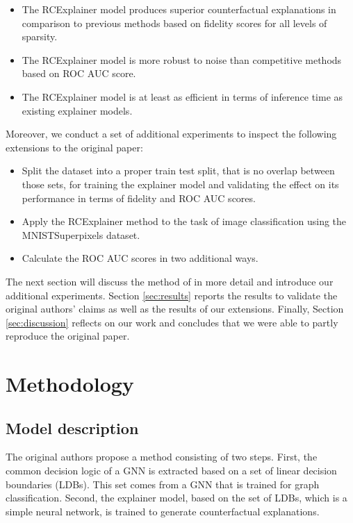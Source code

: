 \begin{itemize}
    \item The RCExplainer model produces superior counterfactual explanations in comparison to previous methods based on fidelity scores for all levels of sparsity. 
   
    \item The RCExplainer model is more robust to noise than competitive methods based on ROC AUC score. 
  
    \item The RCExplainer model is at least as efficient in terms of inference time as existing explainer models.
\end{itemize}
 
Moreover, we conduct a set of additional experiments to inspect the following extensions to the original paper:
\begin{itemize}
    \item Split the dataset into a proper train test split, that is no overlap between those sets, for training the explainer model and validating the effect on its performance in terms of fidelity and ROC AUC scores.
    \item Apply the RCExplainer method to the task of image classification using the MNISTSuperpixels dataset.
    \item Calculate the ROC AUC scores in two additional ways.
\end{itemize}

The next section will discuss the method of \citep{bajaj2021robust} in more detail and introduce our additional experiments. Section \ref{sec:results} reports the results to validate the original authors' claims as well as the results of our extensions. Finally, Section \ref{sec:discussion} reflects on our work and concludes that we were able to partly reproduce the original paper. 

\section{Methodology}
\label{section:method}
\subsection{Model description} \label{sec:model_description}
The original authors propose a method consisting of two steps. First, the common decision logic of a GNN is extracted based on a set of linear decision boundaries (LDBs). This set comes from a GNN that is trained for graph classification. Second, the explainer model, based on the set of LDBs, which is a simple neural network, is trained to generate counterfactual explanations.

